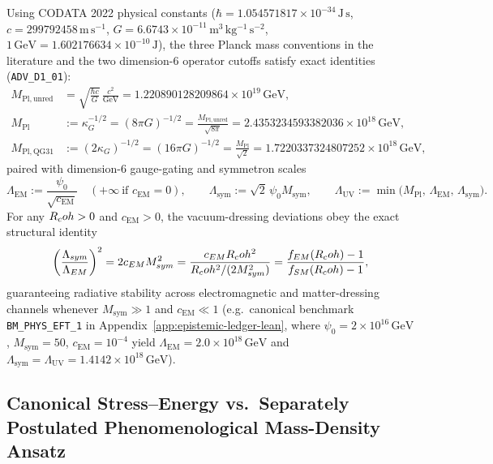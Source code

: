 Using CODATA 2022 physical constants ($\hbar = 1.054571817\times 10^{-34}\,\mathrm{J\,s}$, $c = 299792458\,\mathrm{m\,s^{-1}}$, $G = 6.6743\times 10^{-11}\,\mathrm{m^3\,kg^{-1}\,s^{-2}}$, $1\,\mathrm{GeV} = 1.602176634\times 10^{-10}\,\mathrm{J}$), the three Planck mass conventions in the literature and the two dimension-6 operator cutoffs satisfy exact identities (\texttt{ADV\_D1\_01}):
\begin{align}
M_{\mathrm{Pl,unred}} &= \sqrt{\frac{\hbar c}{G}}\,\frac{c^2}{\mathrm{GeV}} = 1.220890128209864\times 10^{19}\,\mathrm{GeV}, \nonumber\\
M_{\mathrm{Pl}} &:= \kappa_G^{-1/2} = (8\pi G)^{-1/2} = \frac{M_{\mathrm{Pl,unred}}}{\sqrt{8\pi}} = 2.4353234593382036\times 10^{18}\,\mathrm{GeV}, \label{eq:Planck_scales_crosswalk}\\
M_{\mathrm{Pl,QG31}} &:= (2\kappa_G)^{-1/2} = (16\pi G)^{-1/2} = \frac{M_{\mathrm{Pl}}}{\sqrt{2}} = 1.7220337324807252\times 10^{18}\,\mathrm{GeV}, \nonumber
\end{align}
paired with dimension-6 gauge-gating and symmetron scales
\begin{equation}
\Lambda_{\mathrm{EM}} := \frac{\psi_0}{\sqrt{c_{\mathrm{EM}}}} \quad (+\infty\ \text{if } c_{\mathrm{EM}}=0),
\qquad
\Lambda_{\mathrm{sym}} := \sqrt{2}\,\psi_0 M_{\mathrm{sym}},
\qquad
\Lambda_{\mathrm{UV}} := \min\bigl(M_{\mathrm{Pl}},\,\Lambda_{\mathrm{EM}},\,\Lambda_{\mathrm{sym}}\bigr).
\label{eq:Lambda_UV_ceiling}
\end{equation}
For any $R_coh > 0$ and $c_{\mathrm{EM}} > 0$, the vacuum-dressing deviations obey the exact structural identity
\begin{equation}
\left(\frac{\Lambda_{sym}}{\Lambda_{EM}}\right)^2
= 2 c_{EM} M_{sym}^2
= \frac{c_{EM}R_coh^2}{R_coh^2 / (2 M_{sym}^2)}
= \frac{f_{EM}(R_coh) - 1}{f_{SM}(R_coh) - 1},
\label{eq:cutoff_ratio_identity}
\end{equation}
guaranteeing radiative stability across electromagnetic and matter-dressing channels whenever $M_{\mathrm{sym}} \gg 1$ and $c_{\mathrm{EM}} \ll 1$ (e.g.\ canonical benchmark \texttt{BM\_PHYS\_EFT\_1} in Appendix~\ref{app:epistemic-ledger-lean}, where $\psi_0 = 2\times 10^{16}\,\mathrm{GeV}$, $M_{\mathrm{sym}} = 50$, $c_{\mathrm{EM}} = 10^{-4}$ yield $\Lambda_{\mathrm{EM}} = 2.0\times 10^{18}\,\mathrm{GeV}$ and $\Lambda_{\mathrm{sym}} = \Lambda_{\mathrm{UV}} = 1.4142\times 10^{18}\,\mathrm{GeV}$).

\subsection{Canonical Stress--Energy vs.\ Separately Postulated Phenomenological Mass-Density Ansatz}

